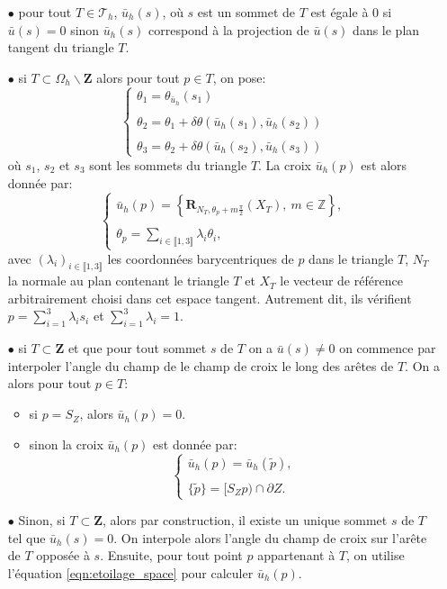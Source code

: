 \begin{itemize}
\item[$\bullet$] pour tout $T\in\mathcal{T}_h$, $\bar{u}_h(s)$, où $s$ est un sommet de $T$ est égale à $0$ si $\bar{u}(s)=0$ sinon $\bar{u}_h(s)$ correspond à la projection de $\bar{u}(s)$ dans le plan tangent du triangle $T$.\\%

\item[$\bullet$] si $T\subset\Omega_h\backslash\mathbf{Z}$ alors pour tout $p\in T$, on pose:
$$
\left\{
\begin{array}{l}
\theta_1 = \theta_{\bar{u}_h}(s_1)\\\\
\theta_2 = \theta_1 + \delta\theta(\bar{u}_h(s_1),\bar{u}_h(s_2))\\\\
\theta_3 = \theta_2 + \delta\theta(\bar{u}_h(s_2),\bar{u}_h(s_3))
\end{array}
\right.
$$
où $s_1$, $s_2$ et $s_3$ sont les sommets du triangle $T$. La croix $\bar{u}_h(p)$ est alors donnée par:
$$
\left\{
\begin{array}{l}
\bar{u}_h(p)=\displaystyle\left\{\mathbf{R}_{N_T,\theta_p+m\frac{\pi}{2}}(X_T), ~m\in\mathbb{Z}\right\},\\\\
\theta_p=\displaystyle\sum_{i\in\llbracket1, 3\rrbracket}\lambda_i\theta_i,
\end{array}
\right.
$$
avec $(\lambda_i)_{i\in\llbracket 1, 3\rrbracket}$ les coordonnées barycentriques de $p$ dans le triangle $T$, $N_T$ la normale au plan contenant le triangle $T$ et $X_T$ le vecteur de référence arbitrairement choisi dans cet espace tangent. Autrement dit, ils vérifient $p=\sum_{i=1}^3\lambda_i s_i$ et $\sum_{i=1}^3\lambda_i=1$.\\
\item[$\bullet$] si $T\subset\mathbf{Z}$ et que pour tout sommet $s$ de $T$ on a $\bar{u}(s)\neq 0$ on commence par interpoler l'angle du champ de le champ de croix  le long des arêtes de $T$. On a alors pour tout $p\in T$:
\begin{itemize}
 \item si $p=S_Z$, alors $\bar{u}_h(p)=0$.\\
 \item sinon la croix $\bar{u}_h(p)$ est donnée par:
\begin{equation}
\label{eqn:etoilage_space}
\left\{
\begin{array}{l}
\bar{u}_h(p)=\bar{u}_h(\widetilde{p}),\\\\
\{\widetilde{p}\}=[S_Zp)\cap\partial Z.
\end{array}
\right.
\end{equation}
\end{itemize}
\item[$\bullet$] Sinon, si $T\subset\mathbf{Z}$, alors par construction, il existe un unique sommet $s$ de $T$ tel que $\bar{u}_h(s)=0$. On interpole alors l'angle du champ de croix sur l'arête de $T$ opposée à $s$. Ensuite, pour tout point $p$ appartenant à $T$, on utilise l'équation \eqref{eqn:etoilage_space} pour calculer $\bar{u}_h(p)$.
\end{itemize}


